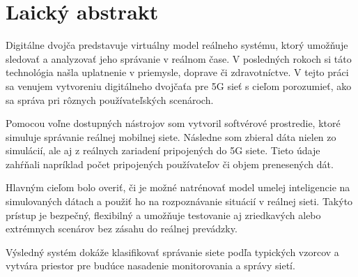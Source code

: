 \chapter{Laický abstrakt}

\par{

Digitálne dvojča predstavuje virtuálny model reálneho systému, ktorý umožňuje sledovať a analyzovať jeho správanie v reálnom čase. V posledných rokoch si táto technológia našla uplatnenie v priemysle, doprave či zdravotníctve. V tejto práci sa venujem vytvoreniu digitálneho dvojčaťa pre 5G sieť s cieľom porozumieť, ako sa správa pri rôznych používateľských scenároch.

Pomocou voľne dostupných nástrojov som vytvoril softvérové prostredie, ktoré simuluje správanie reálnej mobilnej siete. Následne som zbieral dáta nielen zo simulácií, ale aj z reálnych zariadení pripojených do 5G siete. Tieto údaje zahŕňali napríklad počet pripojených používateľov či objem prenesených dát.

Hlavným cieľom bolo overiť, či je možné natrénovať model umelej inteligencie na simulovaných dátach a použiť ho na rozpoznávanie situácií v reálnej sieti. Takýto prístup je bezpečný, flexibilný a umožňuje testovanie aj zriedkavých alebo extrémnych scenárov bez zásahu do reálnej prevádzky.

Výsledný systém dokáže klasifikovať správanie siete podľa typických vzorcov a vytvára priestor pre budúce nasadenie monitorovania a správy sietí. 
}

